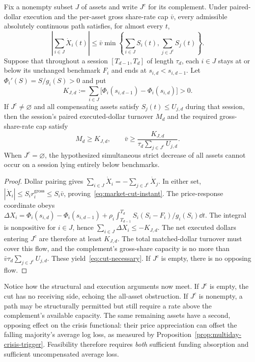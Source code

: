 \documentclass[review,hidelinks,onefignum,onetabnum]{siamonline250211}
\begin{document}
\begin{proposition}\label{prop:market-cut}
Fix a nonempty subset $J$ of assets and write $J^c$ for its complement. Under paired-dollar execution and the per-asset gross share-rate cap $\bar v$, every admissible absolutely continuous path satisfies, for almost every $t$,
\begin{equation}\label{eq:market-cut-instant}
\boxed{\left|\sum_{i\in J}\dot X_i(t)\right|\le
\bar v\min\left\{\sum_{i\in J} S_i(t),\sum_{j\in J^c}S_j(t)\right\}.}
\end{equation}
Suppose that throughout a session $[T_{d-1},T_d]$ of length $\tau_d$, each $i\in J$ stays at or below its unchanged benchmark $F_i$ and ends at $s_{i,d}<s_{i,d-1}$. Let $\Phi_i'(S)=S/g_i(S)>0$ and put
\begin{equation}\label{eq:cut-required}
K_{J,d}:=\sum_{i\in J}\big[\Phi_i(s_{i,d-1})-\Phi_i(s_{i,d})\big]>0.
\end{equation}
If $J^c\ne\varnothing$ and all compensating assets satisfy $S_j(t)\le U_{j,d}$ during that session, then the session's paired executed-dollar turnover $M_d$ and the required gross-share-rate cap satisfy
\begin{equation}\label{eq:cut-necessary}
\boxed{M_d\ge K_{J,d},\qquad
\bar v\ge\frac{K_{J,d}}{\tau_d\sum_{j\in J^c}U_{j,d}}.}
\end{equation}
When $J^c=\varnothing$, the hypothesized simultaneous strict decrease of all assets cannot occur on a session lying entirely below benchmarks.
\end{proposition}
\begin{proof}
Dollar pairing gives $\sum_{i\in J}\dot X_i=-\sum_{j\in J^c}\dot X_j$. In either set, $|\dot X_i|\le S_i r_i^{\mathrm{gross}}\le S_i\bar v$, proving~\eqref{eq:market-cut-instant}. The price-response coordinate obeys
$\Delta X_i=\Phi_i(s_{i,d})-\Phi_i(s_{i,d-1})+
\rho_i\int_{T_{d-1}}^{T_d}S_i(S_i-F_i)/g_i(S_i)\dd t$.
The integral is nonpositive for $i\in J$, hence $\sum_{i\in J}\Delta X_i\le-K_{J,d}$. The net executed dollars entering $J^c$ are therefore at least $K_{J,d}$. The total matched-dollar turnover must cover this flow, and the complement's gross-share capacity is no more than $\bar v\tau_d\sum_{j\in J^c}U_{j,d}$. These yield~\eqref{eq:cut-necessary}. If $J^c$ is empty, there is no opposing flow.
\end{proof}
Notice how the structural and execution arguments now meet. If $J^c$ is empty, the cut has no receiving side, echoing the all-asset obstruction. If $J^c$ is nonempty, a path may be structurally permitted but still require a rate above the complement's available capacity. The same remaining assets have a second, opposing effect on the crisis functional: their price appreciation can offset the falling majority's average log loss, as measured by Proposition~\ref{prop:multiday-crisis-trigger}. Feasibility therefore requires \emph{both} sufficient funding absorption and sufficient uncompensated average loss.
\end{document}
